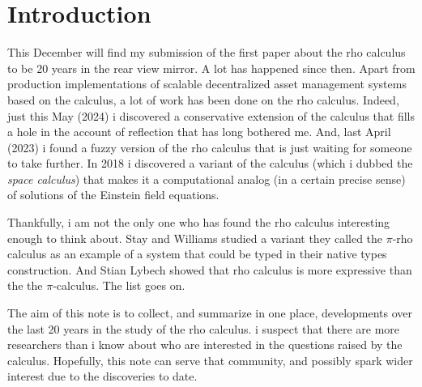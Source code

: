 \section{Introduction}\label{sec:introduction} %
This December will find my submission of the first paper about the rho
calculus to be 20 years in the rear view mirror. A lot has happened
since then. Apart from production implementations of scalable
decentralized asset management systems based on the calculus, a lot of
work has been done on the rho calculus. Indeed, just this May (2024) i
discovered a conservative extension of the calculus that fills a hole
in the account of reflection that has long bothered me. And, last
April (2023) i found a fuzzy version of the rho calculus that is just
waiting for someone to take further. In 2018 i discovered a variant of
the calculus (which i dubbed the \emph{space calculus}) that makes it
a computational analog (in a certain precise sense) of solutions of
the Einstein field equations.

Thankfully, i am not the only one who has found the rho calculus
interesting enough to think about. Stay and Williams studied a variant
they called the $\pi$-rho calculus as an example of a system that
could be typed in their native types construction. And Stian Lybech
showed that rho calculus is more expressive than the the
$\pi$-calculus. The list goes on.

The aim of this note is to collect, and summarize in one place,
developments over the last 20 years in the study of the rho
calculus. i suspect that there are more researchers than i know about
who are interested in the questions raised by the calculus. Hopefully,
this note can serve that community, and possibly spark wider interest
due to the discoveries to date.

